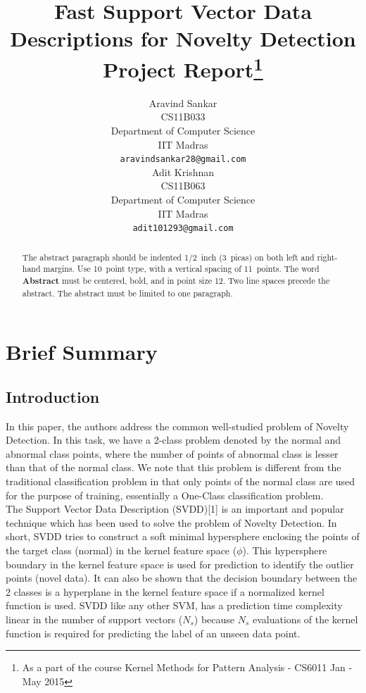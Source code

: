 \documentclass{article} %
\title{Fast Support Vector Data Descriptions for Novelty Detection\\ Project Report\thanks{As a part of the course Kernel Methods for Pattern Analysis - CS6011 Jan - May 2015}}
\author{
Aravind Sankar \\
CS11B033 \\
Department of Computer Science\\
IIT Madras\\
\texttt{aravindsankar28@gmail.com} \\
\And
Adit Krishnan \\
CS11B063\\
Department of Computer Science\\
IIT Madras\\
\texttt{adit101293@gmail.com} \\
}
\begin{document}
\maketitle

\begin{abstract}
The abstract paragraph should be indented 1/2~inch (3~picas) on both left and
right-hand margins. Use 10~point type, with a vertical spacing of 11~points.
The word \textbf{Abstract} must be centered, bold, and in point size 12. Two
line spaces precede the abstract. The abstract must be limited to one
paragraph.
\end{abstract}




\section{Brief Summary}
\subsection{Introduction}

In this paper, the authors address the common well-studied problem of Novelty Detection. In this task, we have a 2-class problem denoted by the normal and abnormal class points, where the number of points of abnormal class is lesser than that of the normal class. We note that this problem is different from the traditional classification problem in that only points of the normal class are used for the purpose of training, essentially a One-Class classification problem.  \\[10pt]

The Support Vector Data Description (SVDD)[1]  is an important and popular technique which has been used to solve the problem of Novelty Detection. In short, SVDD tries to construct a soft minimal hypersphere enclosing the points of the target class (normal) in the kernel feature space ($\phi$). This hypersphere boundary in the kernel feature space is used for prediction to identify the outlier points (novel data). It can also be shown that the decision boundary between the 2 classes is a hyperplane in the kernel feature space if a normalized kernel function is used. SVDD like any other SVM, has a prediction time complexity linear in the number of support vectors ($N_s$) because $N_s$ evaluations of the kernel function is required for predicting the label of an unseen data point. \\[10pt]
\end{document}
